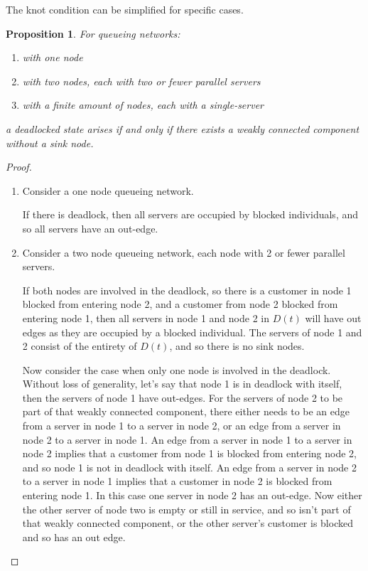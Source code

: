 \documentclass{article}
\newtheorem{proposition}{Proposition}
\numberwithin{equation}{section}
\begin{document}
The knot condition can be simplified for specific cases.\\

\begin{proposition}
For queueing networks:
\begin{enumerate}
  \item with one node
  \item with two nodes, each with two or fewer parallel servers
  \item with a finite amount of nodes, each with a single-server
\end{enumerate}
a deadlocked state arises if and only if there exists a weakly connected component without a sink node.
\end{proposition}

\begin{proof}

\begin{enumerate}

\item
Consider a one node queueing network.

If there is deadlock, then all servers are occupied by blocked individuals, and so all servers have an out-edge.

\item
Consider a two node queueing network, each node with 2 or fewer parallel servers.

If both nodes are involved in the deadlock, so there is a customer in node 1 blocked from entering node 2, and a customer from node 2 blocked from entering node 1, then all servers in node 1 and node 2 in $D(t)$ will have out edges as they are occupied by a blocked individual.
The servers of node 1 and 2 consist of the entirety of $D(t)$, and so there is no sink nodes.

Now consider the case when only one node is involved in the deadlock.
Without loss of generality, let's say that node 1 is in deadlock with itself, then the servers of node 1 have out-edges.
For the servers of node 2 to be part of that weakly connected component, there either needs to be an edge from a server in node 1 to a server in node 2, or an edge from a server in node 2 to a server in node 1.
An edge from a server in node 1 to a server in node 2 implies that a customer from node 1 is blocked from entering node 2, and so node 1 is not in deadlock with itself.
An edge from a server in node 2 to a server in node 1 implies that a customer in node 2 is blocked from entering node 1.
In this case one server in node 2 has an out-edge.
Now either the other server of node two is empty or still in service, and so isn't part of that weakly connected component, or the other server's customer is blocked and so has an out edge.


\end{enumerate}
\end{proof}
\end{document}
